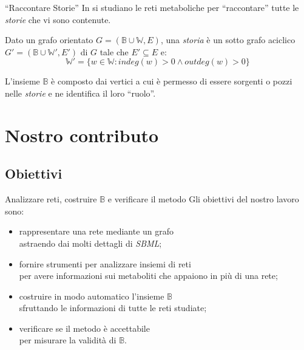 \documentclass{beamer}
\begin{document}
\begin{frame}{``Raccontare Storie''}
In \cite{Crescenzi-Marino} si studiano le reti metaboliche per
``raccontare'' tutte le \emph{storie} che vi sono contenute.
\begin{definition}
  Dato un grafo orientato $G = (\mathbb{B} \cup \mathbb{W}, E)$, una
  \emph{storia} \`e un sotto grafo aciclico $G' = (\mathbb{B} \cup
  \mathbb{W'}, E')$ di $G$ tale che $E' \subseteq E $ e:
  \begin{displaymath}
    \mathbb{W'} = \{w \in \mathbb{W}: indeg(w) > 0 \wedge outdeg(w)
    > 0\}
  \end{displaymath}
\end{definition}
L'insieme $\mathbb{B}$ \`e composto dai vertici a cui \`e permesso di
essere sorgenti o pozzi nelle \emph{storie} e ne identifica il loro
``ruolo''.
\end{frame}

\section{Nostro contributo}

\subsection{Obiettivi}

\begin{frame}{Analizzare reti, costruire $\mathbb{B}$ e verificare il
    metodo}
Gli obiettivi del nostro lavoro sono:
\begin{itemize}
\item<1-> rappresentare una rete mediante un grafo\\
  \footnotesize{astraendo dai molti dettagli di \emph{SBML}};
\item<2-> fornire strumenti per analizzare insiemi di reti\\
  \footnotesize{per avere informazioni sui metaboliti che appaiono in
    pi\`u di una rete};
\item<3-> costruire in modo automatico l'insieme $\mathbb{B}$\\
  \footnotesize{sfruttando le informazioni di tutte le reti studiate};
\item<4-> verificare se il metodo \`e accettabile\\
  \footnotesize{per misurare la validit\`a di $\mathbb{B}$}.
\end{itemize}
\end{frame}
\end{document}
